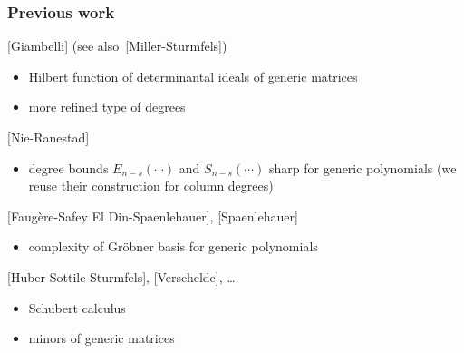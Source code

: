 \documentclass[mathserif,11pt]{beamer}
\def\db#1{\textcolor{_darkblue}{#1}}
\def\rf#1{\db{[{\sf \scriptsize #1}]}}
\begin{document}
\begin{frame}

\frametitle{Previous work}

\rf{Giambelli} (see also~\rf{Miller-Sturmfels})
\begin{itemize}
\item Hilbert function of determinantal ideals of generic matrices
\item more refined type of degrees
\end{itemize}

\medskip

\rf{Nie-Ranestad}
\begin{itemize}
\item degree bounds $E_{n-s}(\cdots)$ and $S_{n-s}(\cdots)$ sharp for generic polynomials 
 (we reuse their construction for column degrees)
\end{itemize}

\medskip

\rf{Faug\`ere-Safey El Din-Spaenlehauer}, \rf{Spaenlehauer}
\begin{itemize}
\item complexity of Gr\"obner basis for generic polynomials
\end{itemize}

\medskip

\rf{Huber-Sottile-Sturmfels}, \rf{Verschelde}, \dots
\begin{itemize}
\item Schubert calculus
\item minors of generic matrices
\end{itemize}

\end{frame}

\end{document}
